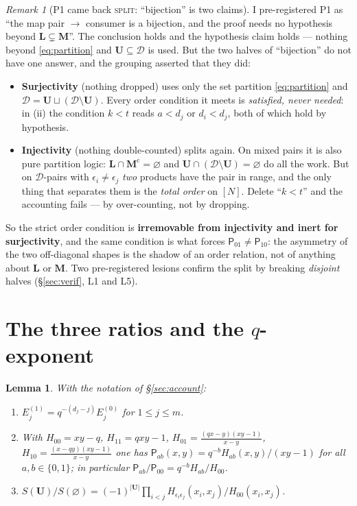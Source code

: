 \documentclass[11pt]{article}
\theoremstyle{plain}
\newtheorem{lem}[thm]{Lemma}
\theoremstyle{definition}
\theoremstyle{remark}
\newtheorem{rem}[thm]{Remark}
\newcommand{\bM}{\mathbf M}
\newcommand{\bL}{\mathbf L}
\newcommand{\bU}{\mathbf U}
\newcommand{\cD}{\mathcal D}
\newcommand{\cm}{{\mathrm c}}
\begin{document}
\begin{rem}[P1 came back \textsc{split}: ``bijection'' is two claims]
\label{rem:split}
I pre-registered P1 as ``the map pair $\to$ consumer is a bijection, and the proof
needs no hypothesis beyond $\bL\subsetneq\bM$''. The conclusion holds and the
hypothesis claim holds --- nothing beyond \eqref{eq:partition} and
$\bU\subseteq\cD$ is used. But the two halves of ``bijection'' do not have one
answer, and the grouping asserted that they did:
\begin{itemize}[leftmargin=1.4em,itemsep=1pt]
\item \textbf{Surjectivity} (nothing dropped) uses only the set partition
\eqref{eq:partition} and $\cD=\bU\sqcup(\cD\setminus\bU)$. Every order condition it
meets is \emph{satisfied, never needed}: in (ii) the condition $k<t$ reads $a<d_j$
or $d_i<d_j$, both of which hold by hypothesis.
\item \textbf{Injectivity} (nothing double-counted) splits again. On mixed pairs it
is also pure partition logic: $\bL\cap\bM^\cm=\varnothing$ and
$\bU\cap(\cD\setminus\bU)=\varnothing$ do all the work. But on $\cD$-pairs with
$\epsilon_i\ne\epsilon_j$ \emph{two} products have the pair in range, and the only
thing that separates them is the \emph{total order} on $[N]$. Delete ``$k<t$'' and
the accounting fails --- by over-counting, not by dropping.
\end{itemize}
So the strict order condition is \textbf{irremovable from injectivity and inert for
surjectivity}, and the same condition is what forces
$\mathsf P_{01}\ne\mathsf P_{10}$: the asymmetry of the two off-diagonal shapes is
the shadow of an order relation, not of anything about $\bL$ or $\bM$. Two
pre-registered lesions confirm the split by breaking \emph{disjoint} halves
(\S\ref{sec:verif}, L1 and L5).
\end{rem}

\section{The three ratios and the \texorpdfstring{$q$}{q}-exponent}
\label{sec:ratios}

\begin{lem}
\label{lem:ratios}
With the notation of \S\ref{sec:account}:
\begin{enumerate}[label=\textup{(\alph*)},leftmargin=2.2em]
\item $E_j^{(1)}=q^{-(d_j-j)}E_j^{(0)}$ for $1\le j\le m$.
\item With $H_{00}=xy-q$, $H_{11}=qxy-1$,
$H_{01}=\frac{(qx-y)(xy-1)}{x-y}$, $H_{10}=\frac{(x-qy)(xy-1)}{x-y}$ one has
$\mathsf P_{ab}(x,y)=q^{-b}H_{ab}(x,y)/(xy-1)$ for all $a,b\in\{0,1\}$; in
particular
$\mathsf P_{ab}/\mathsf P_{00}=q^{-b}H_{ab}/H_{00}$.
\item $S(\bU)/S(\varnothing)
=(-1)^{|\bU|}\prod_{i<j}H_{\epsilon_i\epsilon_j}(x_i,x_j)/H_{00}(x_i,x_j)$.
\end{enumerate}
\end{lem}
\end{document}
